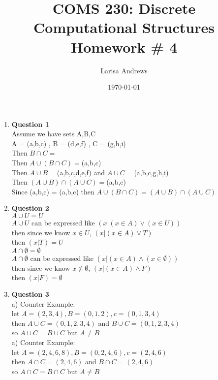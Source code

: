 \documentclass[12pt]{article}
\begin{document}

\title{
\textbf{COMS 230: Discrete Computational Structures}\\
Homework \# 4 \\}
\author{Larisa Andrews}
\date{\today}
\maketitle

\begin{enumerate}

\item {\bf Question 1} \\
Assume we have sets A,B,C \\
A = (a,b,c) , B = (d,e,f) , C = (g,h,i) \\
Then $B \cap C = ${} \\
Then $A \cup (B \cap C) = $(a,b,c) \\
Then $A \cup B = $(a,b,c,d,e,f) and $A \cup C = $(a,b,c,g,h,i)\\
Then $(A \cup B) \cap (A \cup C) = $(a,b,c)\\
Since (a,b,c) = (a,b,c) then $A \cup (B \cap C) = (A \cup B) \cap (A \cup C)$ \\
	
	
	
	

\item {\bf Question 2} \\
$A \cup U = U$ \\
$A \cup U$ can be expressed like $(x | (x \in A) \lor (x \in U))$ \\
then since we know $x \in U$, $ (x | (x \in A) \lor T)$ \\
then $(x | T) = U$\\
$A \cap \emptyset = \emptyset$ \\
$A \cap \emptyset$ can be expressed like $(x | (x \in A) \land (x \in \emptyset))$ \\
then since we know $x \notin \emptyset$, $ (x | (x \in A) \land F)$ \\
then $ (x | F) = \emptyset$ \\
\item {\bf Question 3} \\
a) Counter Example:\\
 let $ A = (2,3,4), B = (0,1,2), c = (0,1,3,4)$\\
 then $ A \cup C = (0,1,2,3,4)$ and $ B \cup C = (0,1,2,3,4)$ \\
 so $ A \cup C = B \cup C$ but $A \ne B $ \\
a) Counter Example:\\
 let $ A = (2,4,6,8), B = (0,2,4,6), c = (2,4,6)$\\
 then $ A \cap C = (2,4,6)$ and $ B \cap C = (2,4,6)$ \\
 so $ A \cap C = B \cap C$ but $A \ne B $ \\



\end{enumerate}
\end{document}
